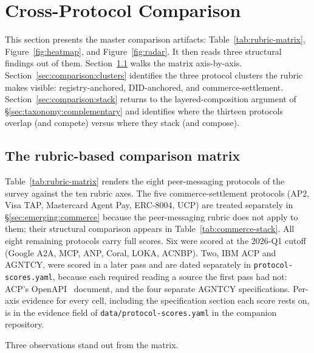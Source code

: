 \section{Cross-Protocol Comparison}
\label{sec:comparison}

This section presents the master comparison artifacts:
Table~\ref{tab:rubric-matrix}, Figure~\ref{fig:heatmap},
and Figure~\ref{fig:radar}. It then reads three structural
findings out of them. Section~\ref{sec:comparison:matrix}
walks the matrix axis-by-axis. Section~\ref{sec:comparison:clusters}
identifies the three protocol clusters the rubric makes
visible: registry-anchored, DID-anchored, and
commerce-settlement. Section~\ref{sec:comparison:stack}
returns to the layered-composition argument of
\S\ref{sec:taxonomy:complementary} and identifies where the
thirteen protocols overlap (and compete) versus where they
stack (and compose).

\subsection{The rubric-based comparison matrix}
\label{sec:comparison:matrix}

Table~\ref{tab:rubric-matrix} renders the eight
peer-messaging protocols of the survey against the ten
rubric axes. The five commerce-settlement protocols (AP2,
Visa TAP, Mastercard Agent Pay, ERC-8004, UCP) are treated
separately in \S\ref{sec:emerging:commerce} because the
peer-messaging rubric does not apply to them; their
structural comparison appears in
Table~\ref{tab:commerce-stack}. All eight remaining
protocols carry full scores. Six were scored at the
2026-Q1 cutoff (Google A2A, MCP, ANP, Coral, LOKA, ACNBP).
Two, IBM ACP and AGNTCY, were scored in a later pass and
are dated separately in
\texttt{protocol-scores.yaml}, because each required
reading a source the first pass had not: ACP's
OpenAPI~\cite{spec_openapi} document, and the four separate
AGNTCY specifications.
Per-axis evidence for every cell, including the
specification section each score rests on, is in the
evidence field of \texttt{data/protocol-scores.yaml} in the
companion repository.



Three observations stand out from the matrix.

